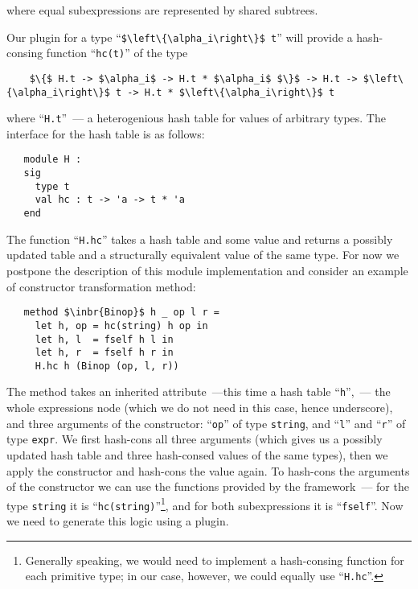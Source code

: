 where equal subexpressions are represented by shared subtrees.

Our plugin for a type ``\lstinline|$\left\{\alpha_i\right\}$ t|'' will provide a hash-consing function ``\lstinline{hc(t)}'' of the type

\begin{lstlisting}
    $\{$ H.t -> $\alpha_i$ -> H.t * $\alpha_i$ $\}$ -> H.t -> $\left\{\alpha_i\right\}$ t -> H.t * $\left\{\alpha_i\right\}$ t
\end{lstlisting}

where ``\lstinline{H.t}''~--- a heterogenious hash table for values of arbitrary types. The interface for the hash table is
as follows:

\begin{lstlisting}
   module H :
   sig
     type t
     val hc : t -> 'a -> t * 'a
   end
\end{lstlisting}

The function ``\lstinline{H.hc}'' takes a hash table and some value and returns a possibly updated table and a structurally equivalent value
of the same type. For now we postpone the description of this module implementation and consider an example of constructor transformation
method:

\begin{lstlisting}   
   method $\inbr{Binop}$ h _ op l r =
     let h, op = hc(string) h op in
     let h, l  = fself h l in
     let h, r  = fself h r in
     H.hc h (Binop (op, l, r))
\end{lstlisting}

The method takes an inherited attribute~---this time a hash table ``\lstinline{h}'',~--- the whole expressions node (which we do not
need in this case, hence underscore), and three arguments of the constructor: ``\lstinline{op}'' of type \lstinline{string}, and
``\lstinline{l}'' and ``\lstinline{r}'' of type \lstinline{expr}. We first hash-cons all three arguments (which gives us a possibly updated
hash table and three hash-consed values of the same types), then we apply the constructor and hash-cons the value again. To hash-cons
the arguments of the constructor we can use the functions provided by the framework~--- for the type \lstinline{string} it is
``\lstinline{hc(string)}''\footnote{Generally speaking, we would need to implement a hash-consing function for each primitive type; in
our case, however, we could equally use ``\lstinline{H.hc}''.}, and for both subexpressions it is ``\lstinline{fself}''. Now we need
to generate this logic using a plugin.

